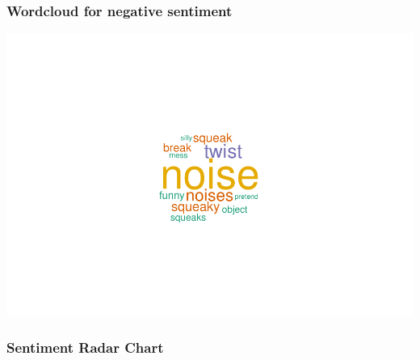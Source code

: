 \documentclass[
  english,
  man]{apa6}
\begin{document}
\hypertarget{wordcloud-for-negative-sentiment}{%
\subsubsection{Wordcloud for negative sentiment}\label{wordcloud-for-negative-sentiment}}

\includegraphics{capstone640_files/figure-latex/unnamed-chunk-3-1.pdf}

\hypertarget{sentiment-radar-chart}{%
\subsubsection{Sentiment Radar Chart}\label{sentiment-radar-chart}}
\end{document}
